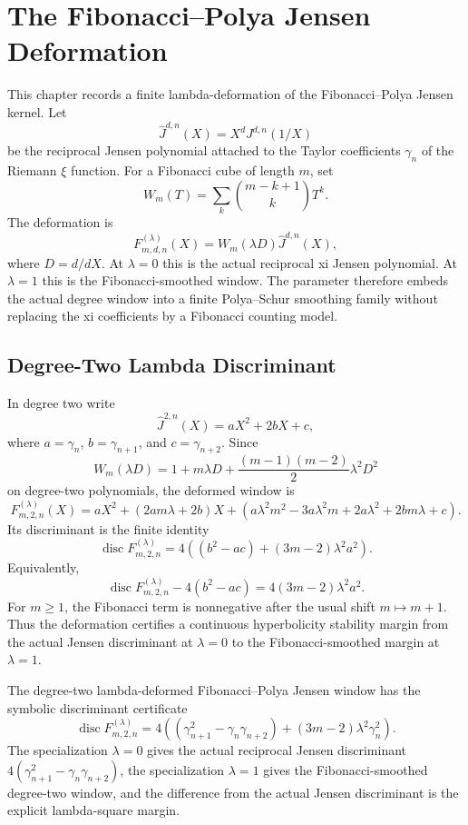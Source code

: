 \chapter{The Fibonacci--Polya Jensen Deformation}
\label{ch:concrete-instances-fibonacci-polya-jensen-deformation}

This chapter records a finite lambda-deformation of the Fibonacci--Polya Jensen kernel. Let
$$
\widehat J^{d,n}(X)=X^dJ^{d,n}(1/X)
$$
be the reciprocal Jensen polynomial attached to the Taylor coefficients $\gamma_n$ of the Riemann $\xi$ function. For a Fibonacci cube of length $m$, set
$$
W_m(T)=\sum_k \binom{m-k+1}{k}T^k.
$$
The deformation is
$$
F^{(\lambda)}_{m,d,n}(X)=W_m(\lambda D)\widehat J^{d,n}(X),
$$
where $D=d/dX$. At $\lambda=0$ this is the actual reciprocal xi Jensen polynomial. At $\lambda=1$ this is the Fibonacci-smoothed window. The parameter therefore embeds the actual degree window into a finite Polya--Schur smoothing family without replacing the xi coefficients by a Fibonacci counting model.

\section{Degree-Two Lambda Discriminant}
\label{sec:fibonacci-polya-jensen-deformation-degree-two}

In degree two write
$$
\widehat J^{2,n}(X)=aX^2+2bX+c,
$$
where $a=\gamma_n$, $b=\gamma_{n+1}$, and $c=\gamma_{n+2}$. Since
$$
W_m(\lambda D)=1+m\lambda D+\frac{(m-1)(m-2)}{2}\lambda^2D^2
$$
on degree-two polynomials, the deformed window is
$$
F^{(\lambda)}_{m,2,n}(X)
=aX^2+(2am\lambda+2b)X+
\left(a\lambda^2m^2-3a\lambda^2m+2a\lambda^2+2bm\lambda+c\right).
$$
Its discriminant is the finite identity
$$
\operatorname{disc}F^{(\lambda)}_{m,2,n}
=4\left((b^2-ac)+(3m-2)\lambda^2a^2\right).
$$
Equivalently,
$$
\operatorname{disc}F^{(\lambda)}_{m,2,n}-4(b^2-ac)
=4(3m-2)\lambda^2a^2.
$$
For $m\ge 1$, the Fibonacci term is nonnegative after the usual shift $m\mapsto m+1$. Thus the deformation certifies a continuous hyperbolicity stability margin from the actual Jensen discriminant at $\lambda=0$ to the Fibonacci-smoothed margin at $\lambda=1$.

\begin{theorem}
\label{thm:fibonacci-polya-jensen-deformation-certificate}
The degree-two lambda-deformed Fibonacci--Polya Jensen window has the symbolic discriminant certificate
$$
\operatorname{disc}F^{(\lambda)}_{m,2,n}
=4\left((\gamma_{n+1}^2-\gamma_n\gamma_{n+2})+(3m-2)\lambda^2\gamma_n^2\right).
$$
The specialization $\lambda=0$ gives the actual reciprocal Jensen discriminant $4(\gamma_{n+1}^2-\gamma_n\gamma_{n+2})$, the specialization $\lambda=1$ gives the Fibonacci-smoothed degree-two window, and the difference from the actual Jensen discriminant is the explicit lambda-square margin.
\end{theorem}

